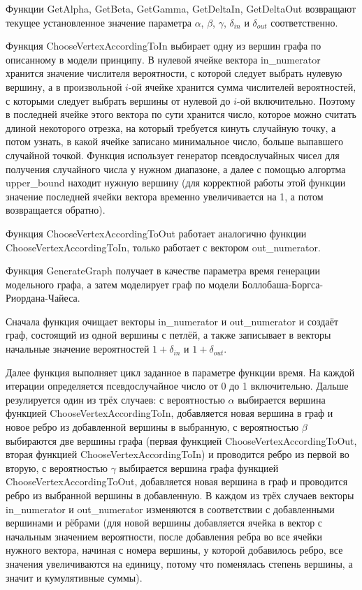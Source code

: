 \documentclass[14pt]{extreport}
\begin{document}
Функции GetAlpha, GetBeta, GetGamma, GetDeltaIn, GetDeltaOut возвращают текущее установленное значение параметра $\alpha$, $\beta$, $\gamma$, $\delta_{in}$ и $\delta_{out}$ соответственно.

Функция ChooseVertexAccordingToIn выбирает одну из вершин графа по описанному в модели принципу. В нулевой ячейке вектора in\_numerator хранится значение числителя вероятности, с которой следует выбрать нулевую вершину, а в произвольной $i$-ой ячейке хранится сумма числителей вероятностей, с которыми следует выбрать вершины от нулевой до $i$-ой включительно. Поэтому в последней ячейке этого вектора по сути хранится число, которое можно считать длиной некоторого отрезка, на который требуется кинуть случайную точку, а потом узнать, в какой ячейке записано минимальное число, больше выпавшего случайной точкой. Функция использует генератор псевдослучайных чисел для получения случайного числа у нужном диапазоне, а далее с помощью алгортма upper\_bound находит нужную вершину (для корректной работы этой функции значение последней ячейки вектора временно увеличивается на 1, а потом возвращается обратно).

Функция ChooseVertexAccordingToOut работает аналогично функции ChooseVertexAccordingToIn, только работает с вектором out\_numerator.

Функция GenerateGraph получает в качестве параметра время генерации модельного графа, а затем моделирует граф по модели Боллобаша-Боргса-Риордана-Чайеса.

Сначала функция очищает векторы in\_numerator и out\_numerator и создаёт граф, состоящий из одной вершины с петлёй, а также записывает в векторы начальные значение вероятностей $1 + \delta_{in}$ и $1 + \delta_{out}$.

Далее функция выполняет цикл заданное в параметре функции время. На каждой итерации определяется псевдослучайное число от 0 до 1 включительно. Дальше резулируется один из трёх случаев: с вероятностью $\alpha$ выбирается вершина функцией ChooseVertexAccordingToIn, добавляется новая вершина в граф и новое ребро из добавленной вершины в выбранную, с вероятностью $\beta$ выбираются две вершины графа (первая функцией ChooseVertexAccordingToOut, вторая функцией ChooseVertexAccordingToIn) и проводится ребро из первой во вторую, с вероятностью $\gamma$ выбирается вершина графа функцией ChooseVertexAccordingToOut, добавляется новая вершина в граф и проводится ребро из выбранной вершины в добавленную. В каждом из трёх случаев векторы in\_numerator и out\_numerator изменяются в соответствии с добавленными вершинами и рёбрами (для новой вершины добавляется ячейка в вектор с начальным значением вероятности, после добавления ребра во все ячейки нужного вектора, начиная с номера вершины, у которой добавилось ребро, все значения увеличиваются на единицу, потому что поменялась степень вершины, а значит и кумулятивные суммы).
\end{document}
